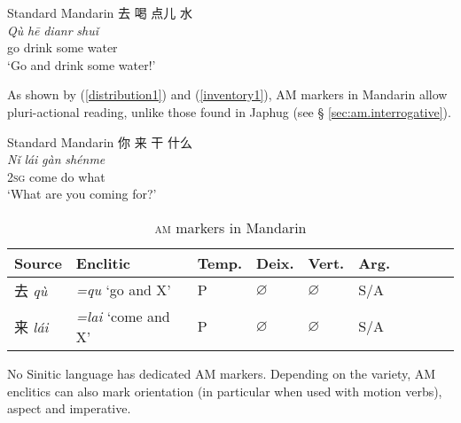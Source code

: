 \documentclass[oneside,a4paper,11pt]{article}
\newcommand{\ipa}[1]{{\phon\textit{#1}}}
\newcommand{\zh}[1]{{\cn #1}}
\newcommand{\sens}[1]{‘#1’}
\begin{document}
\begin{exe}
\ex Standard Mandarin \citep{lamarre17deictic} \label{inventory2}
\glll
\zh{去} \zh{喝} \zh{点儿} \zh{水} \\
\ipa{Qù} \ipa{hē} \ipa{dianr} \ipa{shuǐ} \\
go drink some water \\
\glt \sens{Go and drink some water!}
\end{exe}

As shown by (\ref{distribution1}) and (\ref{inventory1}), AM markers in Mandarin allow pluri-actional reading, unlike those found in Japhug (see § \ref{sec:am.interrogative}).

\begin{exe}
\ex Standard Mandarin \label{inventory1}
\glll
\zh{你} \zh{来} \zh{干} \zh{什么}  \\
\ipa{Nǐ} \ipa{lái} \ipa{gàn} \ipa{shénme}  \\
\textsc{2sg} come do what \\
 \glt \sens{What are you coming for?}
\end{exe}

\begin{table} [H]
\caption{\textsc{am} markers in Mandarin} \centering
\begin{tabular}{llllllllll}
\toprule
Source &Enclitic & Temp.& Deix. & Vert.& Arg. \\
\midrule
\zh{去} \ipa{qù} &	\ipa{=qu} `go and X' &	P &		$\varnothing$ &$\varnothing$&	S/A & \\
 \zh{来}  \ipa{lái} &	\ipa{=lai} `come and X' &	P &		$\varnothing$ &$\varnothing$&	S/A & \\
\bottomrule
\end{tabular}
\end{table}


No Sinitic language has  dedicated AM markers. Depending on the variety, AM enclitics can also mark orientation (in particular when used with motion verbs), aspect and imperative.
\end{document}
